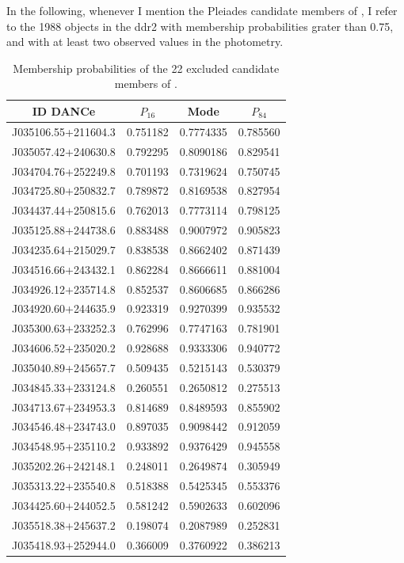 In the following, whenever I mention the Pleiades candidate members of \citet{Bouy2015}, I refer to the 1988 objects in the \gls{ddr2} with \citet{Bouy2015} membership probabilities grater than 0.75, and with at least two observed values in the photometry.

\begin{table}[htdp]
\caption{Membership probabilities of the 22 excluded candidate members of \citet{Bouy2015}.}
\begin{center}
\begin{tabular}{|c|c|c|c|}
\hline
ID DANCe & $P_{16}$ & Mode & $P_{84}$\\
\hline
\hline
J035106.55+211604.3 &0.751182& 0.7774335&    0.785560\\
J035057.42+240630.8 &0.792295& 0.8090186&   0.829541 \\
J034704.76+252249.8& 0.701193& 0.7319624 &   0.750745\\
J034725.80+250832.7 &0.789872& 0.8169538 &  0.827954 \\
J034437.44+250815.6 &0.762013& 0.7773114 &   0.798125\\
J035125.88+244738.6& 0.883488& 0.9007972 &  0.905823 \\
J034235.64+215029.7 &0.838538& 0.8662402 &  0.871439 \\
J034516.66+243432.1 &0.862284& 0.8666611 &   0.881004\\
J034926.12+235714.8& 0.852537& 0.8606685 &  0.866286 \\
J034920.60+244635.9 &0.923319& 0.9270399 &  0.935532 \\
J035300.63+233252.3 &0.762996& 0.7747163 &  0.781901 \\
J034606.52+235020.2& 0.928688& 0.9333306 &  0.940772 \\
J035040.89+245657.7 &0.509435& 0.5215143 &  0.530379 \\
J034845.33+233124.8 &0.260551& 0.2650812 &  0.275513 \\
J034713.67+234953.3& 0.814689& 0.8489593 &  0.855902 \\
J034546.48+234743.0 &0.897035& 0.9098442 &  0.912059 \\
J034548.95+235110.2 &0.933892& 0.9376429 &   0.945558\\
J035202.26+242148.1& 0.248011& 0.2649874 &   0.305949\\
J035313.22+235540.8 &0.518388& 0.5425345 &  0.553376 \\
J034425.60+244052.5 &0.581242& 0.5902633 &  0.602096 \\
J035518.38+245637.2& 0.198074& 0.2087989 &  0.252831 \\
J035418.93+252944.0& 0.366009& 0.3760922 &  0.386213 \\
\hline
\end{tabular}
\end{center}
\label{tab:22excluded}
\end{table}%


